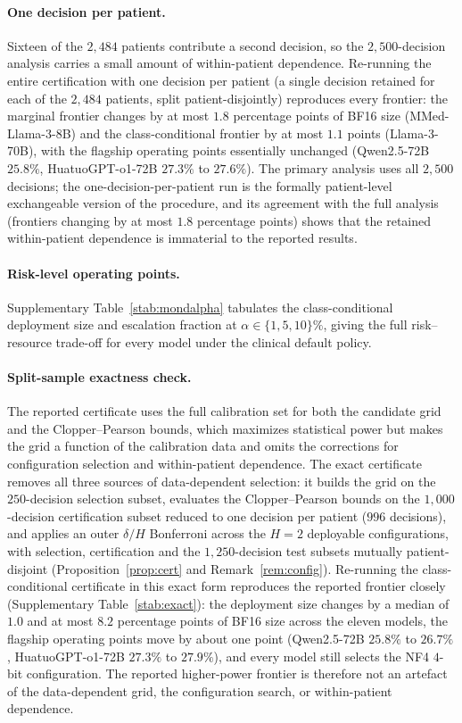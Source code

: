 \documentclass[11pt]{article}
\theoremstyle{plain}
\begin{document}
\paragraph{One decision per patient.} Sixteen of the $2{,}484$ patients contribute a second decision, so
the $2{,}500$-decision analysis carries a small amount of within-patient dependence. Re-running the
entire certification with one decision per patient (a single decision retained for each of the $2{,}484$
patients, split patient-disjointly) reproduces every frontier: the marginal frontier changes by at most
$1.8$ percentage points of BF16 size (MMed-Llama-3-8B) and the class-conditional frontier by at most
$1.1$ points (Llama-3-70B), with the flagship operating points essentially unchanged (Qwen2.5-72B
$25.8\%$, HuatuoGPT-o1-72B $27.3\%$ to $27.6\%$). The primary analysis uses all $2{,}500$ decisions; the
one-decision-per-patient run is the formally patient-level exchangeable version of the procedure, and its
agreement with the full analysis (frontiers changing by at most $1.8$ percentage points) shows that the
retained within-patient dependence is immaterial to the reported results.

\paragraph{Risk-level operating points.} Supplementary Table~\ref{stab:mondalpha} tabulates the
class-conditional deployment size and escalation fraction at $\alpha\in\{1,5,10\}\%$, giving the full
risk--resource trade-off for every model under the clinical default policy.

\paragraph{Split-sample exactness check.} The reported certificate uses the full calibration set for
both the candidate grid and the Clopper--Pearson bounds, which maximizes statistical power but makes the
grid a function of the calibration data and omits the corrections for configuration selection and
within-patient dependence. The exact certificate removes all three sources of data-dependent selection:
it builds the grid on the $250$-decision selection subset, evaluates the Clopper--Pearson
bounds on the $1{,}000$-decision certification subset reduced to one decision per patient ($996$ decisions),
and applies an outer $\delta/H$
Bonferroni across the $H=2$ deployable configurations, with selection, certification and the $1{,}250$-decision
test subsets mutually patient-disjoint (Proposition~\ref{prop:cert} and
Remark~\ref{rem:config}). Re-running the class-conditional certificate in this exact form reproduces the
reported frontier closely (Supplementary Table~\ref{stab:exact}):
the deployment size changes by a median of $1.0$ and at most $8.2$ percentage points of BF16 size across
the eleven models, the flagship operating points move by about one point (Qwen2.5-72B $25.8\%$ to
$26.7\%$, HuatuoGPT-o1-72B $27.3\%$ to $27.9\%$), and every model still selects the NF4 $4$-bit
configuration. The reported higher-power frontier is therefore not an artefact of the data-dependent grid,
the configuration search, or within-patient dependence.
\end{document}
